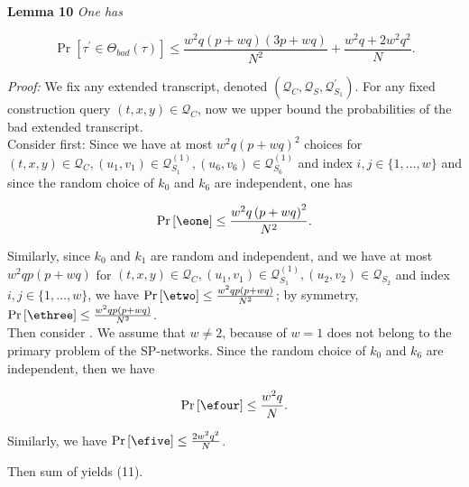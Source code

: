 \noindent \textbf{Lemma 10} \emph{One has}

\begin{equation}
\operatorname{Pr}[\tau^{\prime} \in \Theta_{bad}(\tau)] \leq \frac{w^2 q (p+w q) (3 p +w q)}{N^{2}} + \frac{w^{2} q + 2 w^2 q^2}{N}.
\end{equation}

\noindent \emph{Proof:} We fix any extended transcript, denoted $\left(\mathcal{Q}_{C}, \mathcal{Q}_{S}, \mathcal{Q}_{S_{1}}^{\prime}\right)$. For any fixed construction query $(t, x, y) \in \mathcal{Q}_{C}$, now we upper bound the probabilities of the bad extended transcript.\\

\noindent Consider \eone first: Since we have at most $w^{2} q \left(p+w q\right)^{2}$ choices for $(t, x, y) \in \mathcal{Q}_{C}, \left(u_{1}, v_{1}\right) \in \mathcal{Q}_{S_{1}}^{(1)}, \left(u_{6}, v_{6}\right) \in \mathcal{Q}_{S_{6}}^{(1)}$ and index $i, j \in \{1, \ldots, w\}$ and since the random choice of $k_{0}$ and $k_{6}$ are independent, one has

$$
\operatorname{Pr}\left[\eone\right] \leq \frac{w^{2} q \left(p+w q\right)^{2}}{N^{2}}.
$$

Similarly, since $k_{0}$ and $k_{1}$ are random and independent, and we have at most $w^{2} q p \left(p+w q\right)$ for $(t, x, y) \in \mathcal{Q}_{C}, \left(u_{1}, v_{1}\right) \in \mathcal{Q}_{S_{1}}^{(1)}, \left(u_{2}, v_{2}\right) \in \mathcal{Q}_{S_{2}}$ and index $i, j \in \{1, \ldots, w\}$, we have $\operatorname{Pr}\left[\etwo\right] \leq \frac{w^{2} q p \left(p+w q\right)}{N^{2}}$; by symmetry, $\operatorname{Pr}\left[\ethree\right] \leq \frac{w^{2} q p \left(p+w q\right)}{N^{2}}$. \\

\noindent Then consider \bfour. We assume that $w \neq 2$, because of $w = 1$ does not belong to the primary problem of the SP-networks. Since the random choice of $k_{0}$ and $k_{6}$ are independent, then we have

$$
\operatorname{Pr}\left[\efour\right] \leq \frac{w^{2} q}{N}.
$$

Similarly, we have $\operatorname{Pr}\left[\efive\right] \leq \frac{2 w^{2} q^2}{N}$.

\noindent  Then sum of yields (11).


